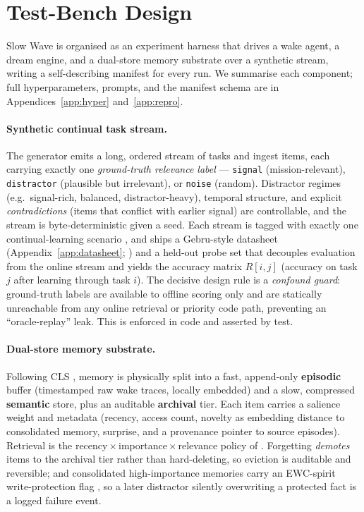 \section{Test-Bench Design}\label{sec:design}

Slow Wave is organised as an experiment harness that drives a wake agent, a
dream engine, and a dual-store memory substrate over a synthetic stream, writing
a self-describing manifest for every run. We summarise each component; full
hyperparameters, prompts, and the manifest schema are in
Appendices~\ref{app:hyper} and~\ref{app:repro}.

\paragraph{Synthetic continual task stream.} The generator emits a long, ordered
stream of tasks and ingest items, each carrying exactly one \emph{ground-truth
relevance label} --- \texttt{signal} (mission-relevant), \texttt{distractor}
(plausible but irrelevant), or \texttt{noise} (random). Distractor regimes
(e.g.\ signal-rich, balanced, distractor-heavy), temporal structure, and
explicit \emph{contradictions} (items that conflict with earlier signal) are
controllable, and the stream is byte-deterministic given a seed. Each stream is
tagged with exactly one continual-learning scenario
\citep{vandeven2022threetypes}, and ships a Gebru-style datasheet
(Appendix~\ref{app:datasheet}; \citealp{gebru2021datasheets}) and a held-out
probe set that decouples evaluation from the online stream and yields the
accuracy matrix $R[i,j]$ (accuracy on task $j$ after learning through task $i$).
The decisive design rule is a \emph{confound guard}: ground-truth labels are
available to offline scoring only and are statically unreachable from any online
retrieval or priority code path, preventing an ``oracle-replay'' leak. This is
enforced in code and asserted by test.

\paragraph{Dual-store memory substrate.} Following CLS
\citep{kumaran2016cls,mcclelland1995cls}, memory is physically split into a fast,
append-only \textbf{episodic} buffer (timestamped raw wake traces, locally
embedded) and a slow, compressed \textbf{semantic} store, plus an auditable
\textbf{archival} tier. Each item carries a salience weight and metadata
(recency, access count, novelty as embedding distance to consolidated memory,
surprise, and a provenance pointer to source episodes). Retrieval is the
recency\,$\times$\,importance\,$\times$\,relevance policy of
\citet{park2023generativeagents}. Forgetting \emph{demotes} items to the
archival tier rather than hard-deleting, so eviction is auditable and reversible;
and consolidated high-importance memories carry an EWC-spirit write-protection
flag \citep{kirkpatrick2017ewc}, so a later distractor silently overwriting a
protected fact is a logged failure event.


